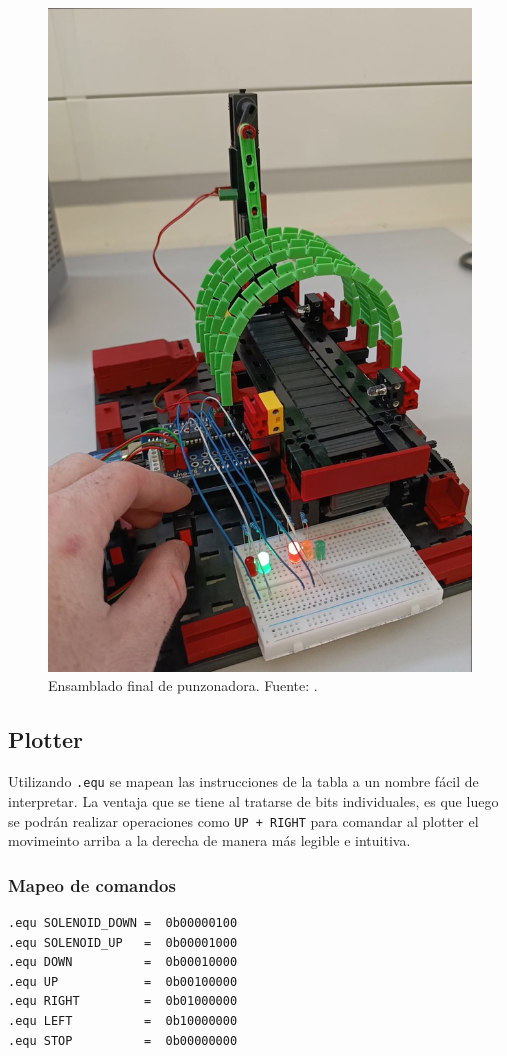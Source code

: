 \begin{figure}[H]
  \centering
  \includegraphics[width=0.7\linewidth]{./Anexos/Resultados/Punzonadora/Circuito.jpg}
  \caption{Ensamblado final de punzonadora. Fuente: \cite{LabDrive}.}
  \label{fig:punzonadora_circuito}
\end{figure}

\subsection{Plotter}

Utilizando \texttt{.equ} se mapean las instrucciones de la tabla a un nombre fácil de interpretar. La ventaja que se tiene al tratarse de bits individuales, es que luego se podrán realizar operaciones como \texttt{UP + RIGHT} para comandar al plotter el movimeinto arriba a la derecha de manera más legible e intuitiva.

\subsubsection{Mapeo de comandos}
\begin{verbatim}
.equ SOLENOID_DOWN =  0b00000100
.equ SOLENOID_UP   =  0b00001000
.equ DOWN          =  0b00010000
.equ UP            =  0b00100000
.equ RIGHT         =  0b01000000
.equ LEFT          =  0b10000000
.equ STOP          =  0b00000000
\end{verbatim}

